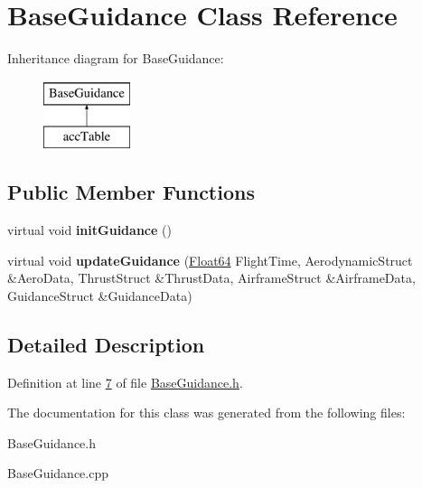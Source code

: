 \hypertarget{class_base_guidance}{}\section{Base\+Guidance Class Reference}
\label{class_base_guidance}
Inheritance diagram for Base\+Guidance\+:\begin{figure}[H]
\begin{center}
\leavevmode
\includegraphics[height=2.000000cm]{class_base_guidance}
\end{center}
\end{figure}
\subsection*{Public Member Functions}
\begin{DoxyCompactItemize}
\item 
\mbox{\label{class_base_guidance_a9c9108c3ca007689265dc991c2a012fa}} 
virtual void {\bfseries init\+Guidance} ()
\item 
\mbox{\label{class_base_guidance_a0092008303b3fcc7664d04892c4878c3}} 
virtual void {\bfseries update\+Guidance} (\hyperlink{group___tools_ga3f1431cb9f76da10f59246d1d743dc2c}{Float64} Flight\+Time, Aerodynamic\+Struct \&Aero\+Data, Thrust\+Struct \&Thrust\+Data, Airframe\+Struct \&Airframe\+Data, Guidance\+Struct \&Guidance\+Data)
\end{DoxyCompactItemize}


\subsection{Detailed Description}


Definition at line \hyperlink{_base_guidance_8h_source_l00007}{7} of file \hyperlink{_base_guidance_8h_source}{Base\+Guidance.\+h}.



The documentation for this class was generated from the following files\+:\begin{DoxyCompactItemize}
\item 
Base\+Guidance.\+h\item 
Base\+Guidance.\+cpp\end{DoxyCompactItemize}
